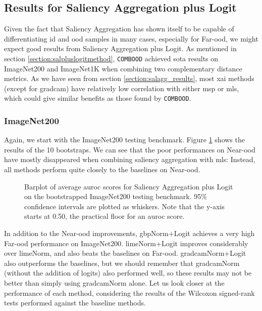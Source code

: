\documentclass[UKenglish]{uiomasterthesis} %
\theoremstyle{definition}
\begin{document}
\subsection{Results for Saliency Aggregation plus Logit} \label{section:salagglogits_results}

Given the fact that Saliency Aggregation has shown itself to be capable of differentiating \ac{id} and \ac{ood} samples in many cases, especially for Far-\ac{ood}, we might expect good results from Saliency Aggregation plus Logit. As mentioned in section \ref{section:salpluslogitmethod}, \texttt{COMBOOD} \cite{combood} achieved \ac{sota} results on ImageNet200 and ImageNet1K when combining two complementary distance metrics. As we have seen from section \ref{section:salagg_results}, most \ac{xai} methods (except for \ac{gradcam}) have relatively low correlation with either \ac{msp} or \ac{mls}, which could give similar benefits as those found by \texttt{COMBOOD}.

\subsubsection{ImageNet200}

Again, we start with the ImageNet200 testing benchmark. Figure \ref{fig:imagenet200_salpluslogit_bootstrap_barplot} shows the results of the 10 bootstraps. We can see that the poor performances on Near-\ac{ood} have mostly disappeared when combining saliency aggregation with \ac{mls}: Instead, all methods perform quite closely to the baselines on Near-\ac{ood}.

\begin{figure}[hbtp]
    \begin{center}
        
    \end{center}
    \caption[ImageNet200 Saliency Aggregation plus Logit Bootstrap]{Barplot of average \ac{auroc} scores for Saliency Aggregation plus Logit on the bootstrapped ImageNet200 testing benchmark. 95\% confidence intervals are plotted as whiskers. Note that the y-axis starts at 0.50, the practical floor for an \ac{auroc} score.}
    \label{fig:imagenet200_salpluslogit_bootstrap_barplot}
\end{figure}

In addition to the Near-\ac{ood} improvements, \ac{gbp}Norm+Logit achieves a very high Far-\ac{ood} performance on ImageNet200. \ac{lime}Norm+Logit improves considerably over \ac{lime}Norm, and also beats the baselines on Far-\ac{ood}. \ac{gradcam}Norm+Logit also outperforms the baselines, but we should remember that \ac{gradcam}Norm (without the addition of logits) also performed well, so these results may not be better than simply using \ac{gradcam}Norm alone. Let us look closer at the performance of each method, considering the results of the Wilcoxon signed-rank tests performed against the baseline methods.
\end{document}
